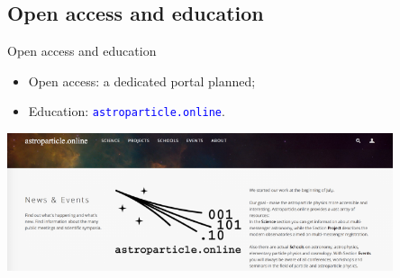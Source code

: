 \subsection{Open access and education}

\begin{frame}{Open access and education}
\vspace{-4em}
\begin{itemize}
\item Open access: a dedicated portal planned;
\item Education: \textcolor{blue}{\texttt{astroparticle.online}}.
\end{itemize}
\centering
\includegraphics[width=0.85\textwidth]{pics/astro_onl.png}
\end{frame}
